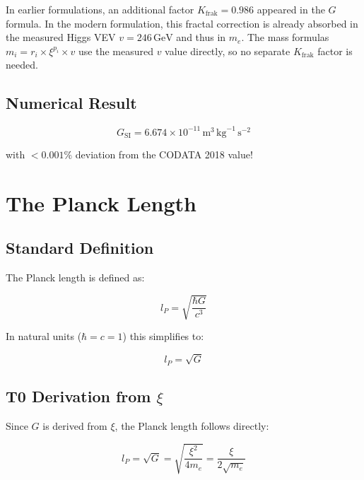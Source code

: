 \begin{remark}
	In earlier formulations, an additional factor $K_{\text{frak}} = 0.986$ appeared 
	in the $G$ formula. In the modern formulation, this fractal correction is already 
	absorbed in the measured Higgs VEV $v = 246\,\text{GeV}$ and thus in $m_e$. The mass 
	formulas $m_i = r_i \times \xi^{p_i} \times v$ use the measured $v$ value 
	directly, so no separate $K_{\text{frak}}$ factor is needed.
\end{remark}

\subsection{Numerical Result}

\begin{equation}
	G_{\text{SI}} = 6.674 \times 10^{-11}\,\text{m}^3\,\text{kg}^{-1}\,\text{s}^{-2}
	\label{eq:G_result}
\end{equation}

with $< 0.001\%$ deviation from the CODATA 2018 value!

\section{The Planck Length}

\subsection{Standard Definition}

The Planck length is defined as:

\begin{equation}
	l_P = \sqrt{\frac{\hbar G}{c^3}}
	\label{eq:planck_length_standard}
\end{equation}

In natural units ($\hbar = c = 1$) this simplifies to:

\begin{equation}
	l_P = \sqrt{G}
	\label{eq:planck_length_natural}
\end{equation}

\subsection{T0 Derivation from $\xi$}

Since $G$ is derived from $\xi$, the Planck length follows directly:

\begin{equation}
	l_P = \sqrt{G} = \sqrt{\frac{\xi^2}{4 m_e}} = \frac{\xi}{2\sqrt{m_e}}
	\label{eq:planck_from_xi}
\end{equation}

